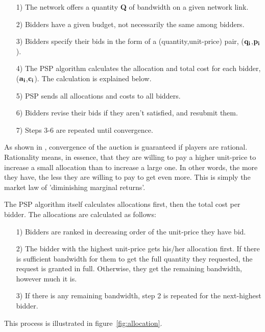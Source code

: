 \begin{enumerate}
\item[1)] The network offers a quantity {\bf Q} of bandwidth on a given network link.
\item[2)] Bidders have a given budget, not necessarily the same among bidders.
\item[3)] Bidders specify their bids in the form of a (quantity,unit-price) pair, (${\bf q_i}$,${\bf p_i}$).
\item[4)] The PSP algorithm calculates the allocation and total cost for each bidder, (${\bf a_i}$,${\bf c_i}$). The calculation is explained below.
\item[5)] PSP sends all allocations and costs to all bidders.
\item[6)] Bidders revise their bids if they aren't satisfied, and resubmit them.
\item[7)] Steps 3-6 are repeated until convergence.
\end{enumerate}

As shown in \cite{PSP}, convergence of the auction is guaranteed if players are rational. Rationality means, in essence, that they are willing to pay a higher unit-price to increase a small allocation than to increase a large one. In other words, the more they have, the less they are willing to pay to get even more. This is simply the market law of 'diminishing marginal returns'.

The PSP algorithm itself calculates allocations first, then the total cost per bidder. The allocations are calculated as follows:

\begin{enumerate}
\item[1)] Bidders are ranked in decreasing order of the unit-price they have bid.
\item[2)] The bidder with the highest unit-price gets his/her allocation first. If there is sufficient bandwidth for them to get the full quantity they requested, the request is granted in full. Otherwise, they get the remaining bandwidth, however much it is.
\item[3)] If there is any remaining bandwidth, step 2 is repeated for the next-highest bidder.
\end{enumerate}

This process is illustrated in figure~\ref{fig:allocation}.

